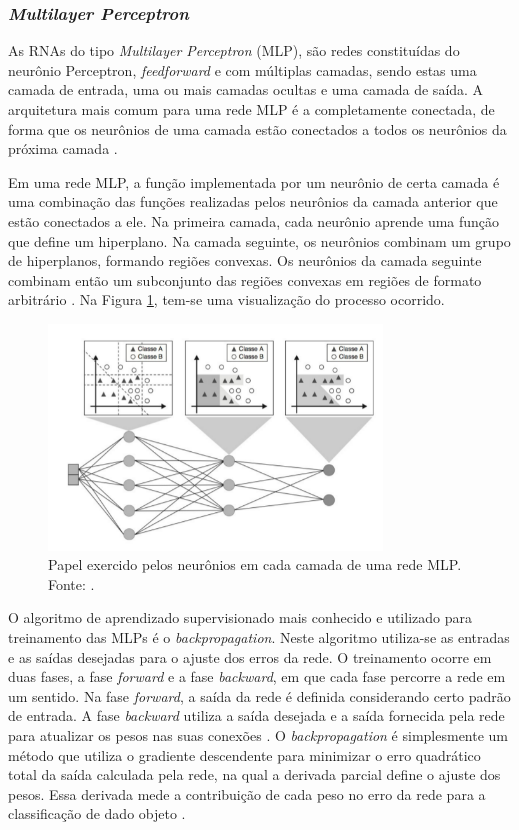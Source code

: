 \subsubsection{\emph{Multilayer Perceptron}}
\label{subsubsec:mlp}

As RNAs do tipo \emph{Multilayer Perceptron} (MLP), são redes constituídas do neurônio Perceptron, \emph{feedforward} e com múltiplas camadas, sendo estas uma camada de entrada, uma ou mais camadas ocultas e uma camada de saída. A arquitetura mais comum para uma rede MLP é a completamente conectada, de forma que os neurônios de uma camada estão conectados a todos os neurônios da próxima camada \cite{faceli}.

Em uma rede MLP, a função implementada por um neurônio de certa camada é uma combinação das funções realizadas pelos neurônios da camada anterior que estão conectados a ele. Na primeira camada, cada neurônio aprende uma função que define um hiperplano. Na camada seguinte, os neurônios combinam um grupo de hiperplanos, formando regiões convexas. Os neurônios da camada seguinte combinam então um subconjunto das regiões convexas em regiões de formato arbitrário \cite{faceli}. Na Figura \ref{fig:aprendizado-mlp}, tem-se uma visualização do processo ocorrido.


\begin{figure}[h!]
\centering
\includegraphics[height=6cm]{imgs/aprendizado-mlp}
\caption{Papel exercido pelos neurônios em cada camada de uma rede MLP. Fonte: \cite{faceli}.}
\label{fig:aprendizado-mlp}
\end{figure}

O algoritmo de aprendizado supervisionado mais conhecido e utilizado para treinamento das MLPs é o \emph{backpropagation}. Neste algoritmo utiliza-se as entradas e as saídas desejadas para o ajuste dos erros da rede. O treinamento ocorre em duas fases, a fase \emph{forward} e a fase \emph{backward}, em que cada fase percorre a rede em um sentido. Na fase \emph{forward}, a saída da rede é definida considerando certo padrão de entrada. A fase \emph{backward} utiliza a saída desejada e a saída fornecida pela rede para atualizar os pesos nas suas conexões \cite{braga}. O \emph{backpropagation} é simplesmente um método que utiliza o gradiente descendente para minimizar o erro quadrático total da saída calculada pela rede, na qual a derivada parcial define o ajuste dos pesos. Essa derivada mede a contribuição de cada peso no erro da rede para a classificação de dado objeto \cite{fausett, faceli}.

